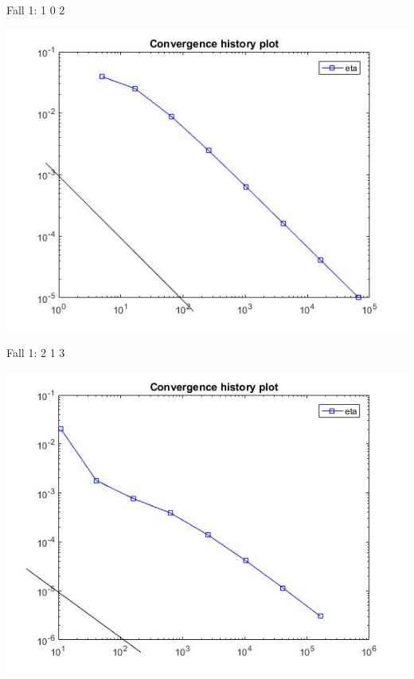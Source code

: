 \documentclass[xcolor=svgnames,ngerman]{beamer}
\begin{document}
		\begin{frame}{Fall 1: 1 0 2}
\begin{center}
	\includegraphics[scale=0.3]{102.jpg}
\end{center}

	\end{frame}	
	
			\begin{frame}{Fall 1: 2 1 3}
\begin{center}
	\includegraphics[scale=0.3]{213.jpg}
\end{center}

	\end{frame}	
	
\end{document}
